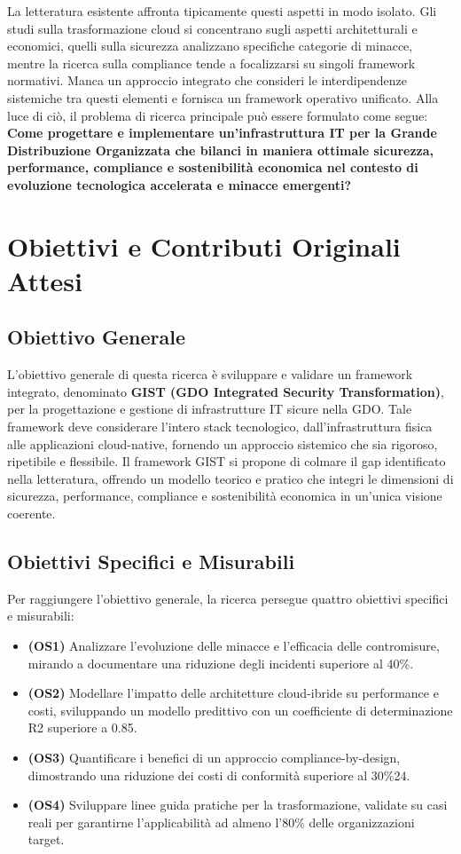 \begin{refsection}
\begin{itemize}
\end{itemize}
La letteratura esistente affronta tipicamente questi aspetti in modo isolato. Gli studi sulla trasformazione cloud si concentrano sugli aspetti architetturali e economici\autocite{forrester2024}, quelli sulla sicurezza analizzano specifiche categorie di minacce\autocite{ponemon2024}, mentre la ricerca sulla compliance tende a focalizzarsi su singoli framework normativi. Manca un approccio integrato che consideri le interdipendenze sistemiche tra questi elementi e fornisca un framework operativo unificato.
Alla luce di ciò, il problema di ricerca principale può essere formulato come segue:
\textbf{Come progettare e implementare un'infrastruttura IT per la Grande Distribuzione Organizzata che bilanci in maniera ottimale sicurezza, performance, compliance e sostenibilità economica nel contesto di evoluzione tecnologica accelerata e minacce emergenti? }

\section{Obiettivi e Contributi Originali Attesi}
\subsection{Obiettivo Generale}
L'obiettivo generale di questa ricerca è sviluppare e validare un framework integrato, denominato
\textbf{GIST (GDO Integrated Security Transformation)}, per la progettazione e gestione di infrastrutture IT sicure nella GDO. Tale framework deve considerare l'intero stack tecnologico, dall'infrastruttura fisica alle applicazioni cloud-native, fornendo un approccio sistemico che sia rigoroso, ripetibile e flessibile. 
Il framework GIST si propone di colmare il gap identificato nella letteratura, offrendo un modello teorico e pratico che integri le dimensioni di sicurezza, performance, compliance e sostenibilità economica in un'unica visione coerente.

\subsection{Obiettivi Specifici e Misurabili}
Per raggiungere l'obiettivo generale, la ricerca persegue quattro obiettivi specifici e misurabili:
\begin{itemize}
    \item \textbf{(OS1)} Analizzare l'evoluzione delle minacce e l'efficacia delle contromisure, mirando a documentare una riduzione degli incidenti superiore al 40\%.
    \item \textbf{(OS2)} Modellare l'impatto delle architetture cloud-ibride su performance e costi, sviluppando un modello predittivo con un coefficiente di determinazione R2 superiore a 0.85.
    \item \textbf{(OS3)} Quantificare i benefici di un approccio compliance-by-design, dimostrando una riduzione dei costi di conformità superiore al 30\%24.
    \item \textbf{(OS4)} Sviluppare linee guida pratiche per la trasformazione, validate su casi reali per garantirne l'applicabilità ad almeno l'80\% delle organizzazioni target.


\end{itemize}
\end{refsection}
